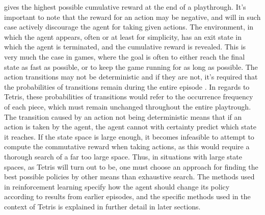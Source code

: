 gives the highest possible cumulative reward at the end of a playthrough. 
It's important to note that the reward 
for an action may be negative, and will in such case actively discourage 
the agent for taking given actions.
The environment, in which the agent appears, often 
or at least for simplicity, has an exit state
in which the agent is terminated, and the cumulative reward 
is revealed. This is very much the case in games, where the goal 
is often to either reach the final state as fast as possible,
or to keep the game running for as long as possible.
The action transitions may 
not be deterministic and if they are not,
it's required that the probabilities of transitions
remain during the entire episode \citep{Carr}. In regards to Tetris, these probabilities of
transitions would refer to the occurrence frequency of each piece, which must remain
unchanged throughout the entire playtrough.
The transition caused by an action not being deterministic
means that if an action is taken by the agent, the agent cannot 
with certainty predict which state it reaches.
If the state space 
is large enough, it becomes infeasible to attempt to compute 
the commutative reward when taking actions, as this would require
a thorough search of a far too large space. Thus, in situations 
with large state spaces, as Tetris will turn out to be, one must choose 
an approach for finding the best possible policies by other
means than exhaustive search. The methods used in reinforcement learning 
specify how the agent should change its policy according to 
results from earlier episodes, and the specific methods used in
the context of Tetris is explained in further detail in later sections.













